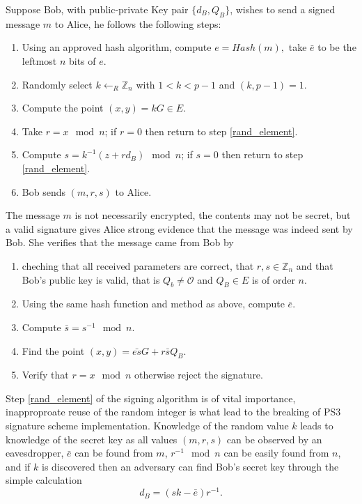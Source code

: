 \documentclass[a4paper, 12pt, envcountsect, runningheads]{article}
\newcommand{\Z}{\mathbb{Z}}
\numberwithin{figure}{section}
\numberwithin{equation}{section}
\begin{document}
Suppose Bob, with public-private Key pair $\{d_B,Q_B\}$, wishes to send a signed message $m$ to Alice, he follows the following steps:
\begin{enumerate}
\item Using an approved hash algorithm, compute $e=Hash(m),$ take $\bar{e}$ to be the leftmost $n$ bits of $e$.
\item\label{rand_element} Randomly select $k\leftarrow_R\Z_n$ with $1<k<p-1$ and $(k,p-1)=1$.
\item Compute the point $(x,y)=kG\in E$.
\item Take $r=x\mod n$; if $r=0$ then return to step \ref{rand_element}.
\item Compute $s=k^{-1}(z+rd_B)\mod n$; if $s=0$ then return to step \ref{rand_element}.
\item Bob sends $(m,r,s)$ to Alice.
\end{enumerate}
The message $m$ is not necessarily encrypted, the contents may not be secret, but a valid signature gives Alice strong evidence that the message was indeed sent by Bob. She verifies that the message came from Bob by 

\begin{enumerate}
\item cheching that all received parameters are correct, that $r,s\in\Z_n$ and that Bob's public key is valid, that is $Q_b\neq \mathcal{O}$ and $Q_B\in E$ is of order $n$.
\item Using the same hash function and method as above, compute $\bar{e}$.
\item Compute $\bar{s}=s^{-1}\mod n$.
\item Find the point $(x,y)=\bar{es}G+r\bar{s}Q_B$.
\item Verify that $r=x\mod n$ otherwise reject the signature.
\end{enumerate}

Step \ref{rand_element} of the signing algorithm is of vital importance, inapproproate reuse of the random integer is what lead to the breaking of PS3 signature scheme implementation. Knowledge of the random value $k$ leads to knowledge of the secret key as all values $(m,r,s)$ can be observed by an eavesdropper, $\bar{e}$ can be found from $m$, $r^{-1}\mod n$ can be easily found from $n$, and if $k$ is discovered then an adversary can find Bob's secret key through the simple calculation $$d_B=(sk-\bar{e})r^{-1}.$$

\end{document}
